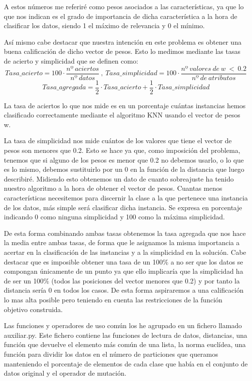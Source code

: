 \documentclass[12pt,a4paper]{article}
\begin{document}
	A estos números me referiré como pesos asociados a las características, ya que lo que nos indican es el grado de importancia de dicha característica a la hora de clasificar los datos, siendo 1 el máximo de relevancia y 0 el mínimo.
	
	Así mismo cabe destacar que nuestra intención en este problema es obtener una buena calificación de dicho vector de pesos. Esto lo medimos mediante las tasas de acierto y simplicidad que se definen como:
	$$Tasa\_acierto = 100\cdot \frac{nº  \ aciertos}{nº \ datos} \ , \ Tasa\_simplicidad = 100\cdot \frac{nº \ valores \ de \ w \ < \ 0.2}{nº \ de \ atributos}$$
	$$Tasa\_agregada = \frac{1}{2}\cdot Tasa\_acierto + \frac{1}{2}\cdot Tasa\_simplicidad$$
	
	La tasa de aciertos lo que nos mide es en un porcentaje cuántas instancias hemos clasificado correctamente mediante el algoritmo KNN usando el vector de pesos w.
	
	La tasa de simplicidad nos mide cuántos de los valores que tiene el vector de pesos son menores que 0.2. Esto se hace ya que, como imposición del problema, tenemos que si alguno de los pesos es menor que 0.2 no debemos usarlo, o lo que es lo mismo, debemos sustituirlo por un 0 en la función de la distancia que luego describiré. Midiendo esto obtenemos un dato de cuanto sobreajuste ha tenido nuestro algoritmo a la hora de obtener el vector de pesos. Cuantas menos características necesitemos para discernir la clase a la que pertenece una instancia de los datos, más simple será clasificar dicha instancia. Se expresa en porcentaje indicando 0 como ninguna simplicidad y 100 como la máxima simplicidad.
	
	De esta forma combinando ambas tasas obtenemos la tasa agregada que nos hace la media entre ambas tasas, de forma que le asignamos la misma importancia a acertar en la clasificación de las instancias y a la simplicidad en la solución. Cabe destacar que es imposible obtener una tasa de un 100\% a no ser que los datos se compongan únicamente de un punto ya que ello implicaría que la simplicidad ha de ser un 100\% (todos las posiciones del vector menores que 0.2) y por tanto la distancia sería 0 en todos los casos. De esta forma aspiraremos a una calificación lo mas alta posible pero teniendo en cuenta las restricciones de la función objetivo construida.
	
	Las funciones y operadores de uso común los he agrupado en un fichero llamado auxiliar.py. Este fichero contiene las funciones de lectura de datos, distancias, una función que devuelve el elemento más común de una lista, la norma euclídea, una función para dividir los datos en el número de particiones que queramos manteniendo el porcentaje de elementos de cada clase que había en el conjunto de datos original y el operador de mutación.
	
\end{document}

